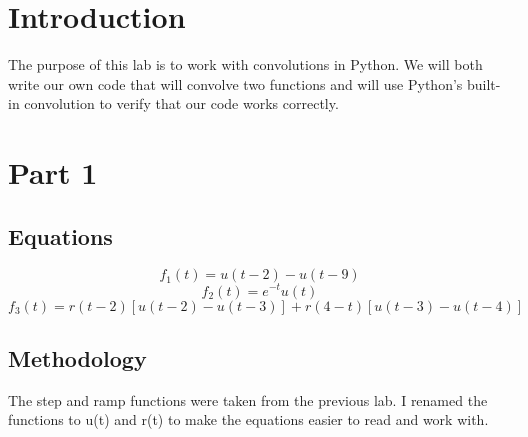 \newpage
\section{Introduction}

The purpose of this lab is to work with convolutions in Python.  We will both write our own code that will convolve two functions and will use Python's built-in convolution to verify that our code works correctly.

\section{Part 1}
\subsection{Equations}

\[f_{1}(t)=u(t-2)-u(t-9)\]
\[f_{2}(t)=e^{-t}u(t)\]
\[f_3(t)=r(t-2)[u(t-2)-u(t-3)]+r(4-t)[u(t-3)-u(t-4)]\]


\subsection{Methodology}

The step and ramp functions were taken from the previous lab.  I renamed the functions to u(t) and r(t) to make the equations easier to read and work with.

